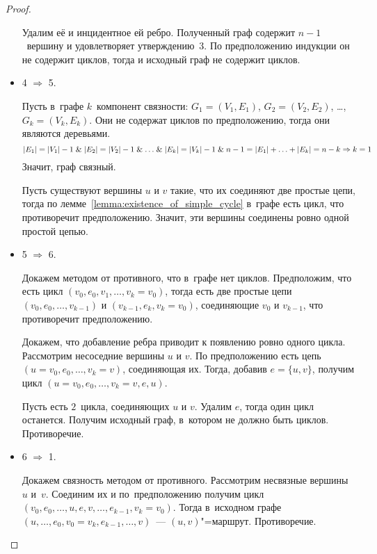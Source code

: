 \begin{proof}
\begin{itemize}
	Удалим её и инцидентное ей ребро.
	Полученный граф содержит $n - 1$~вершину и удовлетворяет утверждению~3.
	По предположению индукции он не содержит циклов, тогда и исходный граф не содержит циклов. \indend
	
	\item 4 $\Rightarrow$ 5.
	
	Пусть в~графе $k$~компонент связности: $G_1 = (V_1, E_1)$, $G_2 = (V_2, E_2)$, \ldots, $G_k = (V_k, E_k)$.
	Они не содержат циклов по предположению, тогда они являются деревьями.
	\begin{equation*}
	|E_1| = |V_1| - 1 \mathrel{\&} |E_2| = |V_2| - 1 \mathrel{\&} \ldots \mathrel{\&} |E_k| = |V_k| - 1 \mathrel{\&} 
	n - 1 = |E_1| + \ldots + |E_k| = n - k \Rightarrow k = 1
	\end{equation*}
	Значит, граф связный.
	
	Пусть существуют вершины $u$ и $v$ такие, что их соединяют две простые цепи, тогда по лемме~\ref{lemma:existence_of_simple_cycle} в~графе есть цикл, что противоречит предположению.
	Значит, эти вершины соединены ровно одной простой цепью.
	
	\item 5 $\Rightarrow$ 6.
	
	Докажем методом от противного, что в~графе нет циклов.
	Предположим, что есть цикл $(v_0, e_0, v_1, \ldots, v_k = v_0)$, тогда есть две простые цепи $(v_0, e_0, \ldots, v_{k-1})$ и $(v_{k-1}, e_k, v_k = v_0)$, соединяющие $v_0$ и $v_{k-1}$, что противоречит предположению.
	
	Докажем, что добавление ребра приводит к появлению ровно одного цикла.
	Рассмотрим несоседние вершины $u$ и $v$.
	По предположению есть цепь $(u = v_0, e_0, \ldots, v_k = v)$, соединяющая их.
	Тогда, добавив $e = \{ u, v \}$, получим цикл $(u = v_0, e_0, \ldots, v_k = v, e, u)$.
	
	Пусть есть $2$~цикла, соединяющих $u$ и $v$.
	Удалим $e$, тогда один цикл останется.
	Получим исходный граф, в~котором не должно быть циклов.
	Противоречие.
	
	\item 6 $\Rightarrow$ 1.
	
	Докажем связность методом от противного.
	Рассмотрим несвязные вершины $u$ и~$v$.
	Соединим их и по~предположению получим цикл $(v_0, e_0, \ldots, u, e, v, \ldots, e_{k-1}, v_k = v_0)$.
	Тогда в~исходном графе $(u, \ldots, e_0, v_0 = v_k, \allowbreak e_{k-1}, \ldots, v)$~--- $(u, v)$"=маршрут.
	Противоречие.
\end{itemize}
\end{proof}

